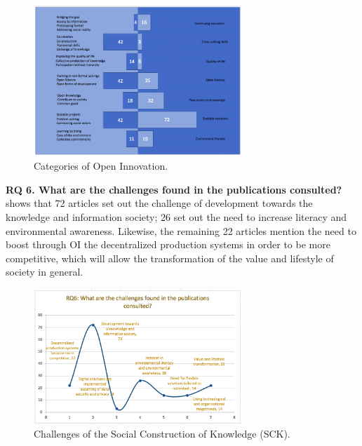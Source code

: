 \documentclass[english]{textolivre}
\begin{document}
\begin{figure}[htbp]
 \centering
 \includegraphics[width=0.7\textwidth]{fig5-33750.jpg}
 \caption{Categories of Open Innovation.}
 \label{fig5}
\end{figure}

\textbf{RQ 6. What are the challenges found in the publications consulted?}  shows that 72 articles set out the challenge of development towards the knowledge and information society; 26 set out the need to increase literacy and environmental awareness. Likewise, the remaining 22 articles mention the need to boost through OI the decentralized production systems in order to be more competitive, which will allow the transformation of the value and lifestyle of society in general.

\begin{figure}[htbp]
 \centering
 \includegraphics[width=0.7\textwidth]{fig6-33750.jpg}
 \caption{Challenges of the Social Construction of Knowledge (SCK).}
 \label{fig6}
\end{figure}
\end{document}
